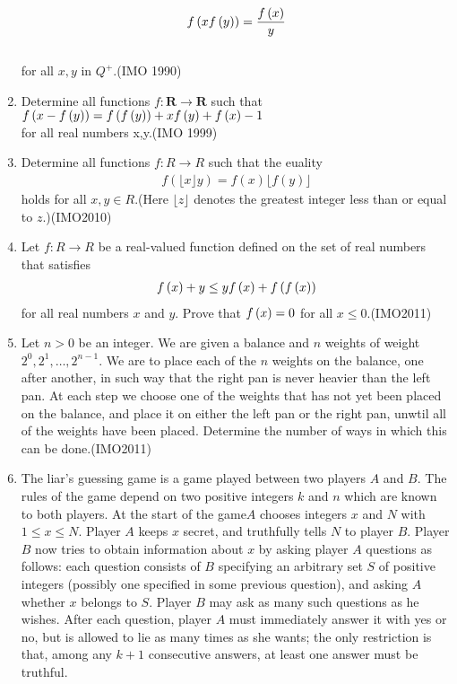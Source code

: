 \begin{enumerate}
			\begin{align*}  f\left(xf\left(y\right)\right)= \frac{f\left(x\right)}{y} \end{align*}\\ for all $x , y$ in $Q^+$.\hfill(IMO 1990)
			\item Determine all functions $f: \textbf{R} \to \textbf{R}$ such that\\$f\left(x - f\left(y\right)\right) = f\left(f\left(y\right)\right) + xf\left(y\right) + f\left(x\right) - 1$ \\for all real numbers x,y.\hfill(IMO 1999)
			\item Determine all functions $f:R \rightarrow R $ such that the euality
				\begin{align}
					f(\lfloor{x} \rfloor{y})=f(x) \lfloor{f(y)} \rfloor
				\end{align}
				holds for all $x,y \in R $.(Here $\lfloor{z}\rfloor$ denotes the greatest integer less than or equal to $z$.)\hfill(IMO2010)
			\item Let $f:R \rightarrow R$ be a real-valued function defined on the set of real numbers that satisfies
				\begin{align}
					f\left(x\right)+y \leq{y f\ensuremath{\left(x\right)}}+f\left(f\left(x\right)\right)
				\end{align}
				for all real numbers $x$ and $y$. Prove that $f \left(x\right)=0$ for all $x\leq{0}$.\hfill(IMO2011)
			\item Let $n>0$ be an integer. We are given a balance and $n$ weights of weight $2^{0}, 2^{1}, \dots, 2^{n-1}$. We are to place each of the $n$ weights on the balance, one after another, in such way that the right pan is never heavier than the left pan. At each step we choose one of the weights that has not yet been placed on the balance, and place it on either the left pan or the right pan, unwtil all of the weights have been placed.
				Determine the number of ways in which this can be done.\hfill(IMO2011)
			\item The liar's guessing game is a game played between two players $A$ and $B$. The rules of the game depend on two positive integers $k$ and $n$ which are known to both players. At the start of the game$A$ chooses integers $x$ and $N$ with $1\leq{x}\leq{N}$. Player $A$ keeps $x$ secret, and truthfully tells $N$ to player $B$. Player $B$ now tries to obtain information about $x$ by asking player $A$ questions as follows: each question consists of $B$ specifying an arbitrary set $S$ of positive integers (possibly one specified in some previous question), and asking $A$ whether $x$ belongs to $S$. Player $B$ may ask as many such questions as he wishes. After each question, player $A$ must immediately answer it with yes or no, but is allowed to lie as many times as she wants; the only restriction is that, among any $k + 1$ consecutive answers, at least one answer must be truthful.

\end{enumerate}

